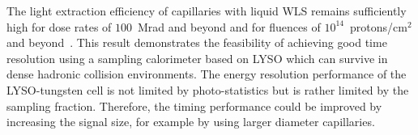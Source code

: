 


The light extraction efficiency of capillaries with liquid WLS remains
sufficiently high for dose rates of $100$~Mrad and beyond and for fluences of
$10^{14}$~protons/$\mathrm{cm}^{2}$ and beyond~\cite{shashlik2}. This result
demonstrates the feasibility of achieving good time resolution using a sampling
calorimeter based on LYSO which can survive in dense hadronic collision environments.
The energy resolution performance of the LYSO-tungsten cell is not limited by
photo-statistics but is rather limited by the sampling fraction. Therefore, the timing
performance could be improved by increasing the signal size, for example by 
using larger diameter capillaries.\\ 


